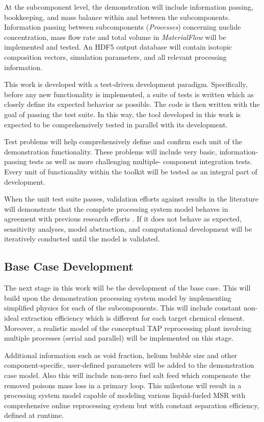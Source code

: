 At the subcomponent level, the demonstration will include information 
passing, bookkeeping, and mass balance within and between the 
subcomponents. Information passing between subcomponents 
(\textit{Processes}) concerning nuclide concentration, mass flow rate 
and total volume in \textit{MaterialFlow} will be implemented and tested. 
An HDF5 output database will contain 
isotopic composition vectors, simulation 
parameters, and all relevant processing information.

This work is developed with a test-driven development paradigm. 
Specifically, before any new functionality is implemented, a suite of 
tests is written which as closely define its expected behavior as 
possible. The code is then written with the goal of passing the test 
suite. In this way, the tool developed in this work is expected to be
comprehensively tested in parallel with its development.

Test problems will help comprehensively define and confirm each unit 
of the demonstration functionality. These problems will include very 
basic, information-passing tests as well as more challenging multiple-
component integration tests. Every unit of functionality
within the toolkit will be tested as an integral part of development.

When the unit test suite passes, validation efforts against results 
in the literature will demonstrate that the complete 
processing system model behaves in agreement with previous research 
efforts \cite{rykhlevskii_advanced_2018, rykhlevskii_modeling_2019}. 
If it does not behave as expected, sensitivity analyses, 
model abstraction, and computational development will be iteratively 
conducted until the model is validated.

\subsection{Base Case Development}
The next stage in this work will be the development of the base case. 
This will build upon the demonstration processing system model by 
implementing simplified physics for each of the subcomponents. This 
will include constant non-ideal extraction efficiency which is 
different for each target chemical element. Moreover, a realistic 
model of the conceptual \gls{TAP} reprocessing plant involving 
multiple processes (serial and parallel) will be implemented on this 
stage. 

Additional information such as void fraction, helium 
bubble size and other component-specific, user-defined 
parameters will be added to the demonstration case model.
Also this will include non-zero fuel salt feed which 
compensate the removed poisons mass loss in a primary loop.
This milestone will result in a processing system model capable of 
modeling various liquid-fueled \gls{MSR} with comprehensive 
online reprocessing system but with constant separation efficiency, 
defined at runtime.

